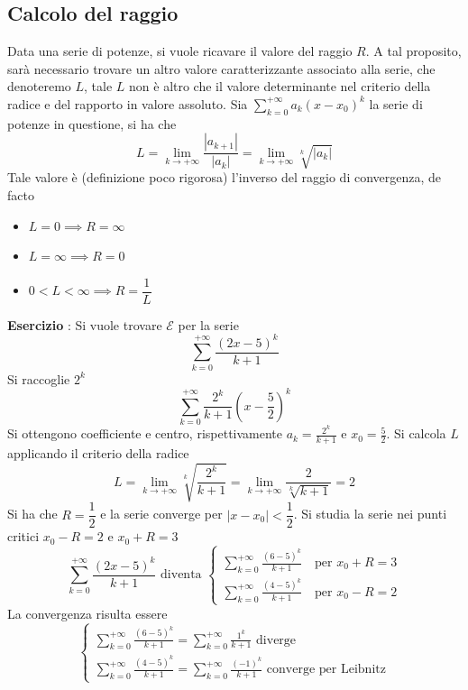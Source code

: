 \documentclass[10pt, letterpaper]{report}
\begin{document}
\subsection{Calcolo del raggio}
Data una serie di potenze, si vuole ricavare il valore del raggio $R$. A tal proposito, sarà necessario 
trovare un altro valore caratterizzante associato alla serie, che denoteremo $L$, tale $L$ non è altro 
che il valore determinante nel criterio della radice e del rapporto in valore assoluto. Sia
 $\displaystyle \sum_{k=0}^{+\infty}a_k(x-x_0)^k $ la serie di potenze in questione, si ha che 
 $$ L = \displaystyle \lim_{k\rightarrow+\infty}\frac{|a_{k+1}|}{|a_k|} 
 = \lim_{k\rightarrow+\infty}\sqrt[k]{|a_k|}$$
 Tale valore è (definizione poco rigorosa) l'inverso del raggio di convergenza, de facto\begin{itemize}
    \item $L=0\implies R=\infty$
    \item $L=\infty\implies R=0$
    \item $0<L<\infty\implies R = \dfrac{1}{L}$ 
 \end{itemize}
 \textbf{Esercizio} : Si vuole trovare $\mathcal{E}$ per la serie 
 $$ \displaystyle \sum_{k=0}^{+\infty}\frac{(2x-5)^k}{k+1}$$
 Si raccoglie $2^k$ 
 $$ \displaystyle \sum_{k=0}^{+\infty}\frac{2^k}{k+1}(x-\frac{5}{2})^k $$
 Si ottengono coefficiente e centro, rispettivamente $a_k=\frac{2^k}{k+1}$ e $x_0 = \frac{5}{2}$. Si 
 calcola $L$ applicando il criterio della radice 
 $$ L =\displaystyle \lim_{k\rightarrow+\infty}\sqrt[k]{\frac{2^k}{k+1}}  
 = \lim_{k\rightarrow+\infty}\frac{2}{\sqrt[k]{k+1}}=2$$
 Si ha che $R=\dfrac{1}{2}$ e la serie converge per $|x-x_0|<\dfrac{1}{2}$. Si studia la serie 
 nei punti critici  $x_0-R=2$  e  $x_0+R=3$
 $$ 
 \displaystyle \sum_{k=0}^{+\infty}\frac{(2x-5)^k}{k+1}\text{ diventa }  \begin{cases}
    \displaystyle \sum_{k=0}^{+\infty}\frac{(6-5)^k}{k+1} \text{  }\text{ per }x_0+R=3  \\
   \displaystyle \sum_{k=0}^{+\infty}\frac{(4-5)^k}{k+1}\text{  }\text{ per }x_0-R=2
 \end{cases}
 $$
 La convergenza risulta essere 
 $$ 
 \begin{cases}
    \displaystyle \sum_{k=0}^{+\infty}\frac{(6-5)^k}{k+1} =\displaystyle \sum_{k=0}^{+\infty}\frac{1^k}{k+1}\text{ diverge}\\
   \displaystyle \sum_{k=0}^{+\infty}\frac{(4-5)^k}{k+1}=\displaystyle \sum_{k=0}^{+\infty}\frac{(-1)^k}{k+1}\text{ converge per Leibnitz}
 \end{cases}
 $$
\end{document}
